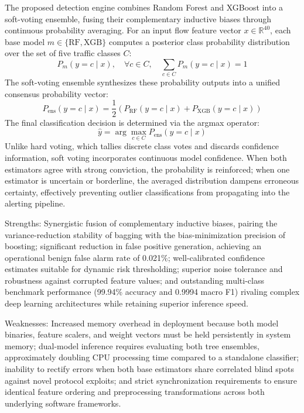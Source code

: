 \documentclass[12pt,a4paper]{report}
\begin{document}
The proposed detection engine combines Random Forest and XGBoost into a soft-voting ensemble, fusing their complementary inductive biases through continuous probability averaging. For an input flow feature vector $x \in \mathbb{R}^{40}$, each base model $m \in \{\text{RF}, \text{XGB}\}$ computes a posterior class probability distribution over the set of five traffic classes $C$:
\begin{equation}
P_m(y = c \mid x), \quad \forall c \in C, \quad \sum_{c \in C} P_m(y = c \mid x) = 1
\end{equation}
The soft-voting ensemble synthesizes these probability outputs into a unified consensus probability vector:
\begin{equation}
P_{\text{ens}}(y = c \mid x) = \frac{1}{2}\left(P_{\text{RF}}(y = c \mid x) + P_{\text{XGB}}(y = c \mid x)\right)
\end{equation}
The final classification decision is determined via the argmax operator:
\begin{equation}
\hat{y} = \arg\max_{c \in C} P_{\text{ens}}(y = c \mid x)
\end{equation}
Unlike hard voting, which tallies discrete class votes and discards confidence information, soft voting incorporates continuous model confidence. When both estimators agree with strong conviction, the probability is reinforced; when one estimator is uncertain or borderline, the averaged distribution dampens erroneous certainty, effectively preventing outlier classifications from propagating into the alerting pipeline.

Strengths: Synergistic fusion of complementary inductive biases, pairing the variance-reduction stability of bagging with the bias-minimization precision of boosting; significant reduction in false positive generation, achieving an operational benign false alarm rate of 0.021\%; well-calibrated confidence estimates suitable for dynamic risk thresholding; superior noise tolerance and robustness against corrupted feature values; and outstanding multi-class benchmark performance (99.94\% accuracy and 0.9994 macro F1) rivaling complex deep learning architectures while retaining superior inference speed.

Weaknesses: Increased memory overhead in deployment because both model binaries, feature scalers, and weight vectors must be held persistently in system memory; dual-model inference requires evaluating both tree ensembles, approximately doubling CPU processing time compared to a standalone classifier; inability to rectify errors when both base estimators share correlated blind spots against novel protocol exploits; and strict synchronization requirements to ensure identical feature ordering and preprocessing transformations across both underlying software frameworks.
\end{document}
